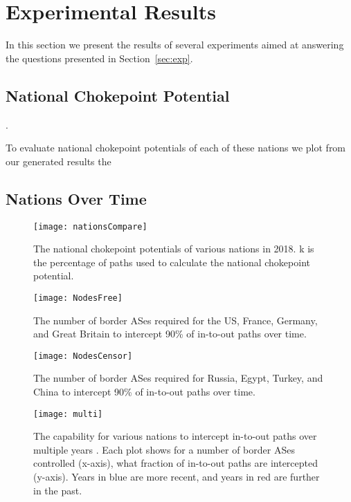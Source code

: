 \section{Experimental Results}

In this section we present the results of several experiments aimed at
answering the questions presented in Section~\ref{sec:exp}. 


\subsection{National Chokepoint Potential}

. 

	To evaluate national chokepoint potentials of each of these nations we
plot from our \toolname{} generated results the 

\subsection{Nations Over Time}


\begin{figure}
	\centering
	\texttt{[image: nationsCompare]}
	\caption{The national chokepoint potentials of various nations in 2018. k is the
	percentage of paths used to calculate the national chokepoint potential.}\label{fig:nationsCompare}
\end{figure}
\begin{figure}
	\centering
	\texttt{[image: NodesFree]}
	\caption{The number of border ASes required for the US, France, Germany, and Great Britain to intercept 90\% of in-to-out paths over time.}\label{fig:nodesFree}
\end{figure}
\begin{figure}
	\centering
	\texttt{[image: NodesCensor]}
	\caption{The number of border ASes required for Russia, Egypt, Turkey, and China to intercept 90\% of in-to-out paths over time.}\label{fig:nodesCensor}
\end{figure}
\begin{figure*}
	\centering
	\texttt{[image: multi]}
	\caption{The capability for various nations to intercept in-to-out paths over multiple years \timerange. Each plot shows for a number of border ASes controlled (x-axis),
	what fraction of in-to-out paths are intercepted (y-axis). Years in blue are more recent, and years in red are further in the past.}\label{fig:multiTime}
\end{figure*}

